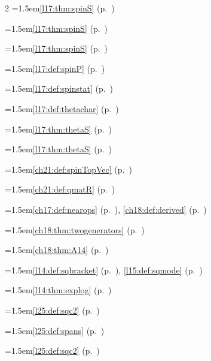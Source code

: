 \begin{multicols}{2}
\hangindent=1.5em\quad \ref{l17:thm:spinS} (p.~\pageref{l17:thm:spinS})\par
\hangindent=1.5em\quad \ref{l17:thm:spinS} (p.~\pageref{l17:thm:spinS})\par
\hangindent=1.5em\quad \ref{l17:thm:spinS} (p.~\pageref{l17:thm:spinS})\par
\hangindent=1.5em\quad \ref{l17:def:spinP} (p.~\pageref{l17:def:spinP})\par
\hangindent=1.5em\quad \ref{l17:def:spinstat} (p.~\pageref{l17:def:spinstat})\par
\hangindent=1.5em\quad \ref{l17:def:thetachar} (p.~\pageref{l17:def:thetachar})\par
\hangindent=1.5em\quad \ref{l17:thm:thetaS} (p.~\pageref{l17:thm:thetaS})\par
\hangindent=1.5em\quad \ref{l17:thm:thetaS} (p.~\pageref{l17:thm:thetaS})\par
\hangindent=1.5em\quad \ref{ch21:def:spinTopVec} (p.~\pageref{ch21:def:spinTopVec})\par
\hangindent=1.5em\quad \ref{ch21:def:qmatR} (p.~\pageref{ch21:def:qmatR})\par
\hangindent=1.5em\quad \ref{ch17:def:nearops} (p.~\pageref{ch17:def:nearops}), \ref{ch18:def:derived} (p.~\pageref{ch18:def:derived})\par
\hangindent=1.5em\quad \ref{ch18:thm:twogenerators} (p.~\pageref{ch18:thm:twogenerators})\par
\hangindent=1.5em\quad \ref{ch18:thm:A14} (p.~\pageref{ch18:thm:A14})\par
\hangindent=1.5em\quad \ref{l14:def:sqbracket} (p.~\pageref{l14:def:sqbracket}), \ref{l15:def:sqmode} (p.~\pageref{l15:def:sqmode})\par
\hangindent=1.5em\quad \ref{l14:thm:explog} (p.~\pageref{l14:thm:explog})\par
\hangindent=1.5em\quad \ref{l25:def:sqc2} (p.~\pageref{l25:def:sqc2})\par
\hangindent=1.5em\quad \ref{l25:def:spans} (p.~\pageref{l25:def:spans})\par
\hangindent=1.5em\quad \ref{l25:def:sqc2} (p.~\pageref{l25:def:sqc2})\par

\end{multicols}
